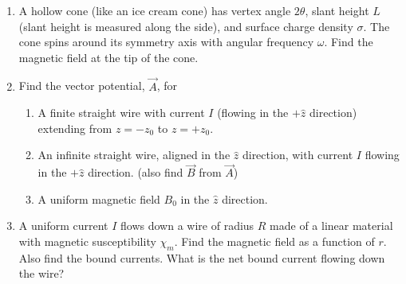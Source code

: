 \documentclass[fleqn]{article}
\begin{document}
\begin{enumerate}
    \item A hollow cone (like an ice cream cone) has vertex angle $2\theta$, slant height $L$ (slant height is measured along the side), 
    and surface charge density $\sigma$. The cone spins around its symmetry axis with angular frequency $\omega$. Find the magnetic field at 
    the tip of the cone.


    \item Find the vector potential, $\overrightarrow{A}$, for
    \begin{enumerate}
      \item A finite straight wire with current $I$ (flowing in the $+\hat{z}$ direction)
      extending from $z=-z_0$ to $z=+z_0$.


      \item An infinite straight wire, aligned in the $\hat{z}$ direction, with current
      $I$ flowing in the $+\hat{z}$ direction. (also find $\overrightarrow{B}$ from $\overrightarrow{A}$)

      
      \item A uniform magnetic field $B_0$ in the $\hat{z}$ direction.


    \end{enumerate}


    \item A uniform current $I$ flows down a wire of radius $R$ made of a linear material with magnetic susceptibility $\chi_m$. Find the 
    magnetic field as a function of $r$. Also find the bound currents. What is the net bound current flowing down the wire?


\end{enumerate}
\end{document}
